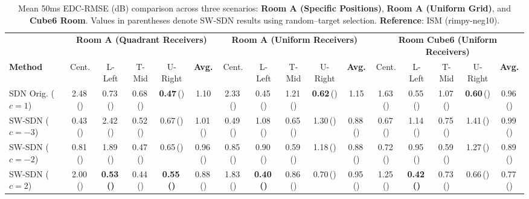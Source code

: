 \documentclass[conference]{IEEEtran}
\begin{document}
\begin{table}[tbh]
    \centering
    \caption{Mean 50ms EDC-RMSE (dB) comparison across three scenarios: \textbf{Room A (Specific Positions)}, \textbf{Room A (Uniform Grid)}, and \textbf{Cube6 Room}. Values in parentheses denote SW-SDN results using random–target selection. \textbf{Reference}: ISM (rimpy-neg10).}
    \label{tab:merged-results-3blocks}
    \renewcommand{\arraystretch}{1.15}
    \scriptsize
    \setlength{\tabcolsep}{2.5pt}
    
    \begin{tabular}{l ccccc | ccccc | ccccc}
        \toprule
        & \multicolumn{5}{c|}{\textbf{Room A (Quadrant Receivers)}} & \multicolumn{5}{c|}{\textbf{Room A (Uniform Receivers)}} & \multicolumn{5}{c}{\textbf{Room Cube6 (Uniform Receivers)}} \\
        \cmidrule(lr){2-6} \cmidrule(lr){7-11} \cmidrule(l){12-16}
        \textbf{Method} & Cent. & L-Left & T-Mid & U-Right & \textbf{Avg.} & Cent. & L-Left & T-Mid & U-Right & \textbf{Avg.} & Cent. & L-Left & T-Mid & U-Right & \textbf{Avg.} \\
        \midrule
        
        SDN Orig. ($c=1$)
            & 2.48\,() & 0.73\,() & 0.68\,() & \textbf{0.47}\,() & 1.10 
            & 2.33\,() & 0.45\,() & 1.21\,() & \textbf{0.62}\,() & 1.15 
            & 1.63\,() & 0.55\,() & 1.07\,() & \textbf{0.60}\,() & 0.96\,() \\
        \midrule
        
        SW-SDN ($c=-3$)
            & 0.43\,() & 2.42\,() & 0.52\,() & 0.67\,() & 1.01\,() 
            & 0.49\,() & 1.08\,() & 0.65\,() & 1.30\,() & 0.88\,() 
            & 0.67\,() & 1.14\,() & 0.75\,() & 1.41\,() & 0.99\,() \\
            
        SW-SDN ($c=-2$)
            & 0.81\,() & 1.89\,() & 0.47\,() & 0.65\,() & 0.96\,() 
            & 0.85\,() & 0.90\,() & 0.59\,() & 1.18\,() & 0.88\,() 
            & 0.72\,() & 0.95\,() & 0.59\,() & 1.27\,() & 0.89\,() \\
            
        SW-SDN ($c=2$)
            & 2.00\,() & \textbf{0.53\,()} & 0.44\,() & \textbf{0.55\,()} & 0.88\,() 
            & 1.83\,() & \textbf{0.40\,()} & 0.86\,() & 0.70\,() & 0.95\,() 
            & 1.25\,() & \textbf{0.42\,()} & 0.73\,() & 0.66\,() & 0.77\,() \\
            

\end{tabular}
\end{table}
\end{document}
